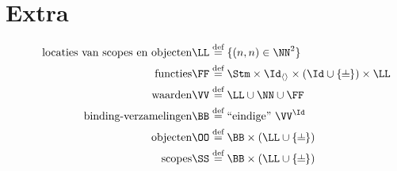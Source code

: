 \section*{Extra}

\begin{align*}
  \tag*{locaties van scopes en objecten}
  \LL &\DEF \{ (n, n) \in \NN^2 \} \\
  \tag*{functies}
  \FF &\DEF \Stm \times \Id_{\langle\rangle} \times (\Id \cup \{\nil\}) \times \LL \\
  \tag*{waarden}
  \VV &\DEF \LL \cup \NN \cup \FF \\
  \tag*{binding-verzamelingen}
  \BB &\DEF \FiniteFunctions{\VV}{\Id} \\
  \tag*{objecten}
  \OO &\DEF \BB \times (\LL \cup \{\nil\}) \\
  \tag*{scopes}
  \SS &\DEF \BB \times (\LL \cup \{\nil\}) \\
\end{align*}

